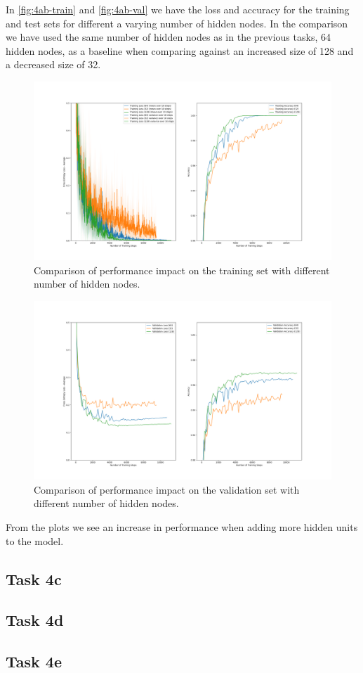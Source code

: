 \documentclass{article}
\begin{document}
In \autoref{fig:4ab-train} and \autoref{fig:4ab-val} we have the loss and accuracy for the training and test sets for different a varying number of hidden nodes. In the comparison we have used the same number of hidden nodes as in the previous tasks, 64 hidden nodes, as a baseline when comparing against an increased size of 128 and a decreased size of 32. 
\begin{figure}[H]
    \centering
    \includegraphics[width=\textwidth]{Assignments/Assignment_2/plots/task4/task4ab_train.png}
    \caption{Comparison of performance impact on the training set with different number of hidden nodes.}
    \label{fig:4ab-train}
\end{figure}

\begin{figure}[H]
    \centering
    \includegraphics[width=\textwidth]{Assignments/Assignment_2/plots/task4/task4ab_val.png}
    \caption{Comparison of performance impact on the validation set with different number of hidden nodes.}
    \label{fig:4ab-val}
\end{figure}

From the plots we see an increase in performance when adding more hidden units to the model. 

\subsection{Task 4c}

\subsection{Task 4d}
\subsection{Task 4e}
\end{document}
